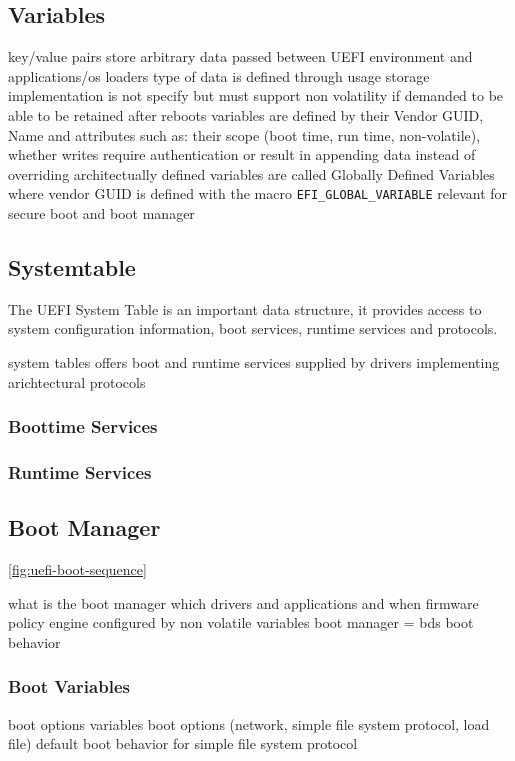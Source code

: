 \subsection{Variables}
key/value pairs
store arbitrary data passed between UEFI environment and applications/os loaders
type of data is defined through usage
storage implementation is not specify but must support non volatility if demanded to be able to be retained after reboots
variables are defined by their Vendor GUID, Name and attributes such as: their scope (boot time, run time, non-volatile), whether writes require authentication or result in appending data instead of overriding
\cite[8.2]{uefi-spec}
architectually defined variables are called Globally Defined Variables where vendor GUID is defined with the macro \lstinline{EFI_GLOBAL_VARIABLE}
\label{sec:uefi-pi:uefi:variables}
\cite[3.3]{uefi-spec}
relevant for secure boot and boot manager

\subsection{Systemtable}
The UEFI System Table is an important data structure, it provides access to system configuration information, boot services, runtime services and protocols.

system tables offers boot and runtime services
supplied by drivers implementing arichtectural protocols %
\subsubsection{Boottime Services}
\subsubsection{Runtime Services}

\subsection{Boot Manager}

\autoref{fig:uefi-boot-sequence}

what is the boot manager
which drivers and applications and when
firmware policy engine
configured by non volatile variables
\cite[3.1.]{uefi-spec}
boot manager = bds
boot behavior
\subsubsection{Boot Variables}
\label{sec:uefi-pi:uefi:boot-manager:boot-variables}
boot options variables
boot options (network, simple file system protocol, load file)
default boot behavior for simple file system protocol

